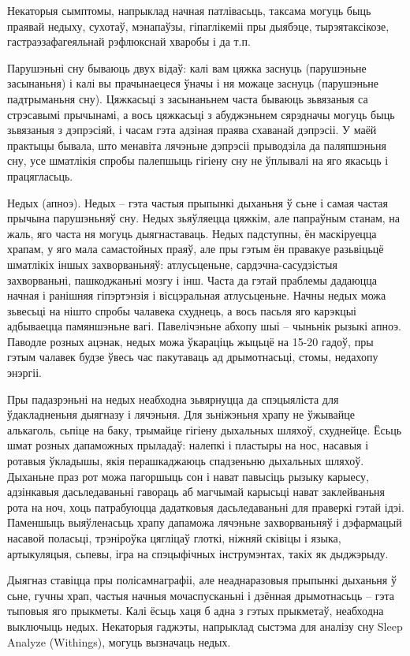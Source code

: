 Некаторыя сымптомы, напрыклад начная патлівасьць, таксама могуць быць праявай недыху, сухотаў, мэнапаўзы, гіпаглікеміі пры дыябэце, тырэятаксікозе, гастраэзафагеяльнай рэфлюкснай хваробы і да т.п.

Парушэньні сну бываюць двух відаў: калі вам цяжка заснуць (парушэньне засынаньня) і калі вы прачынаецеся ўначы і ня можаце заснуць (парушэньне падтрыманьня сну). Цяжкасьці з засынаньнем часта бываюць зьвязаныя са стрэсавымі прычынамі, а вось цяжкасьці з абуджэньнем сярэдначы могуць быць зьвязаныя з дэпрэсіяй, і часам гэта адзіная праява схаванай дэпрэсіі. У маёй практыцы бывала, што менавіта лячэньне дэпрэсіі прыводзіла да паляпшэньня сну, усе шматлікія спробы палепшыць гігіену сну не ўплывалі на яго якасьць і працягласьць.

Недых (апноэ). Недых – гэта частыя прыпынкі дыханьня ў сьне і самая частая прычына парушэньняў сну. Недых зьяўляецца цяжкім, але папраўным станам, на жаль, яго часта ня могуць дыягнаставаць. Недых падступны, ён маскіруецца храпам, у яго мала самастойных праяў, але пры гэтым ён правакуе разьвіцьцё шматлікіх іншых захворваньняў: атлусьценьне, сардэчна-сасудзістыя захворваньні, пашкоджаньні мозгу і інш. Часта да гэтай праблемы дадаюцца начная і ранішняя гіпэртэнзія і вісцэральная атлусьценьне. Начны недых можа зьвесьці на нішто спробы чалавека схуднець, а вось пасьля яго карэкцыі адбываецца памяншэньне вагі. Павелічэньне абхопу шыі – чыньнік рызыкі апноэ. Паводле розных ацэнак, недых можа ўкараціць жыцьцё на 15-20 гадоў, пры гэтым чалавек будзе ўвесь час пакутаваць ад дрымотнасьці, стомы, недахопу энэргіі.

Пры падазрэньні на недых неабходна зьвярнуцца да спэцыяліста для ўдакладненьня дыягназу і лячэньня. Для зьніжэньня храпу не ўжывайце алькаголь, сьпіце на баку, трымайце гігіену дыхальных шляхоў, схуднейце. Ёсьць шмат розных дапаможных прыладаў: налепкі і пластыры на нос, насавыя і ротавыя ўкладышы, якія перашкаджаюць спадзеньню дыхальных шляхоў. Дыханьне праз рот можа пагоршыць сон і нават павысіць рызыку карыесу, адзінкавыя дасьледаваньні гавораць аб магчымай карысьці нават заклейваньня рота на ноч, хоць патрабуюцца дадатковыя дасьледаваньні для праверкі гэтай ідэі. Паменшыць выяўленасьць храпу дапаможа лячэньне захворваньняў і дэфармацый насавой поласьці, трэніроўка цягліцаў глоткі, ніжняй сківіцы і языка, артыкуляцыя, сьпевы, ігра на спэцыфічных інструмэнтах, такіх як дыджэрыду.

Дыягназ ставіцца пры полісамнаграфіі, але неаднаразовыя прыпынкі дыханьня ў сьне, гучны храп, частыя начныя мочаспусканьні і дзённая дрымотнасьць – гэта тыповыя яго прыкметы. Калі ёсьць хаця б адна з гэтых прыкметаў, неабходна выключыць недых. Некаторыя гаджэты, напрыклад сыстэма для аналізу сну Sleep Analyze (Withings), могуць вызначаць недых.

